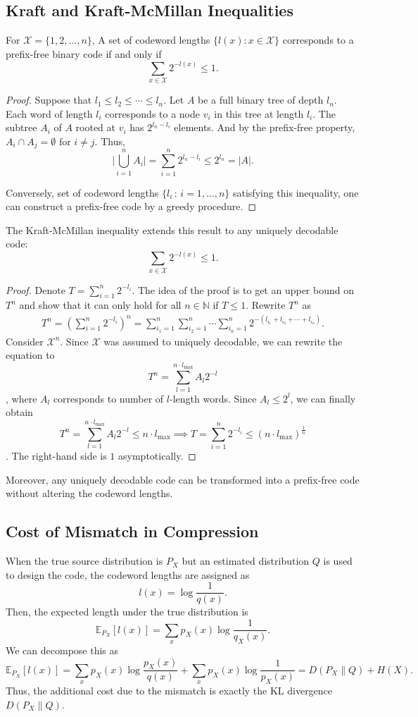 \subsection{Kraft and Kraft-McMillan Inequalities}
\begin{theorem} For $\mathcal{X}=\{1,2,...,n\}$, 
A set of codeword lengths $\{l(x): x\in\mathcal{X}\}$ corresponds to a prefix-free binary code if and only if
\[
\sum_{x\in\mathcal{X}} 2^{-l(x)} \leq 1.
\]
\end{theorem}
\begin{proof}
Suppose that $l_1 \leq l_2 \leq \cdots \leq l_n$. Let $A$ be a full binary tree of depth $l_n$. Each word of length $l_i$ corresponds to a node $v_i$ in this tree at length $l_i$. The subtree $A_i$ of $A$ rooted at $v_i$ has $2^{l_n-l_i}$ elements. And by the prefix-free property, $A_i\cap A_j=\emptyset\text{ for }i\neq j.$  Thus, $$
\Biggl|\bigcup_{i=1}^nA_i\Biggr| =\sum_{i=1}^n2^{l_n-l_i}\leq2^{l_n}=|A|.
$$

Conversely, set of codeword lengths $\{l_i\,:\,i=1,...,n\}$ satisfying this inequality, one can construct a prefix-free code by a greedy procedure.
\end{proof}

The Kraft-McMillan inequality extends this result to any uniquely decodable code:
\[
\sum_{x\in\mathcal{X}} 2^{-l(x)} \leq 1.
\]

\begin{proof}
Denote $T=\sum_{i=1}^n2^{-l_i}.$ The idea of the proof is to get an upper bound on $T^n$ and show that it can only hold for all $n\in\mathbb{N}$ if $T \leq 1$.
Rewrite $T^n$ as
$$
\begin{aligned}
    T^n = \left(\sum_{i=1}^n 2^{-l_i}\right)^n=\sum_{i_1=1}^n\sum_{i_2=1}^n\cdots\sum_{i_n=1}^n2^{-(l_{i_1}+l_{i_2}+\cdots +l_{i_n})}.
\end{aligned}
$$
Consider $\mathcal{X}^n$. Since $\mathcal{X}$ was assumed to uniquely decodable, we can rewrite the equation to
$$T^n = \sum_{l=1}^{n\cdot l_{\max}} A_l 2^{-l}$$,
where $A_l$ corresponds to number of $l$-length words. Since $A_l\leq 2^{l}$, we can finally obtain
$$T^n = \sum_{l=1}^{n\cdot l_{\max}} A_l 2^{-l}\leq n\cdot l_{\max} \implies T=\sum_{i=1}^n 2^{-l_i}\leq (n \cdot l_{\max})^{\frac{1}{n}}$$. The right-hand side is $1$ asymptotically.
\end{proof}
Moreover, any uniquely decodable code can be transformed into a prefix-free code without altering the codeword lengths.

\subsection{Cost of Mismatch in Compression}
When the true source distribution is $P_X$ but an estimated distribution $Q$ is used to design the code, the codeword lengths are assigned as
\[
l(x)=\log\frac{1}{q(x)}.
\]
Then, the expected length under the true distribution is
\[
\mathbb{E}_{P_X}[l(x)] = \sum_{x} p_X(x)\log\frac{1}{q_X(x)}.
\]
We can decompose this as
\[
\mathbb{E}_{P_X}[l(x)] = \sum_{x} p_X(x)\log\frac{p_X(x)}{q(x)} + \sum_{x} p_X(x)\log\frac{1}{p_X(x)} = D(P_X\|Q) + H(X).
\]
Thus, the additional cost due to the mismatch is exactly the KL divergence $D(P_X\|Q)$.

